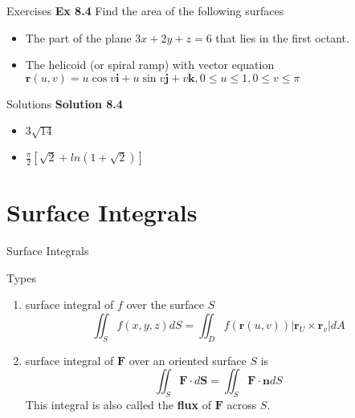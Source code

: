 \documentclass{beamer}
\begin{document}
\begin{frame}{Exercises}
    \textbf{Ex 8.4} Find the area of the following surfaces
    \begin{itemize}
        \item The part of the plane $3x+2y+z=6$ that lies in the first octant.
        \item The helicoid (or spiral ramp) with vector equation $\boldsymbol{r}(u,v)=u\cos{v}\boldsymbol{i}+u\sin{v}\boldsymbol{j}+v\boldsymbol{k},0\leq u\leq 1,0\leq v\leq\pi$
    \end{itemize}
    
\end{frame}

\begin{frame}{Solutions}
\textbf{Solution 8.4}
\begin{itemize}
    \item $3\sqrt{14}$
    \item $\frac{\pi}{2}[\sqrt{2}+ln(1+\sqrt{2})]$
\end{itemize}
    
\end{frame}

\section{Surface Integrals}

\begin{frame}{Surface Integrals}
    \begin{block}{Types}
        \begin{enumerate}
            \item surface integral of $f$ over the surface $S$
            \begin{equation*}
                \iint_Sf(x,y,z)dS=\iint_D f(\boldsymbol{r}(u,v))\big|\boldsymbol{r}_U\times\boldsymbol{r}_v\big|dA
            \end{equation*}
            \item surface integral of $\boldsymbol{F}$ over an oriented surface $S$ is
            \begin{equation*}
                \iint_S \boldsymbol{F}\cdot d\boldsymbol{S}=\iint_S \boldsymbol{F}\cdot\boldsymbol{n}dS
            \end{equation*}
            This integral is also called the \textbf{flux} of $\boldsymbol{F}$ across $S$.
        \end{enumerate}
        
    \end{block}
    
\end{frame}
\end{document}
